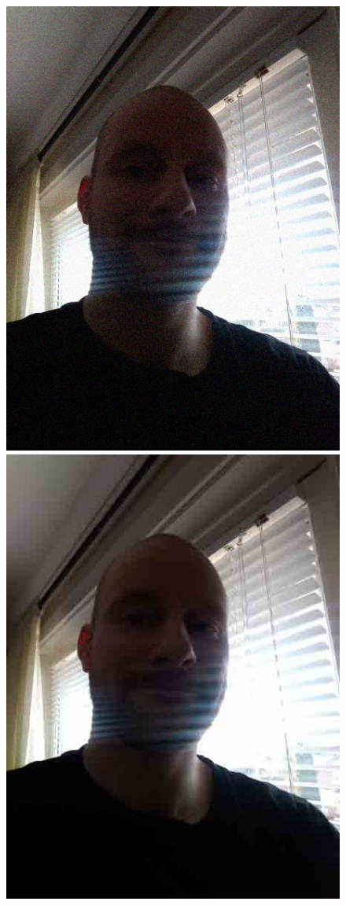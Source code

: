\begin{figure}[h]
    \subfloat
        {\includegraphics[scale = 0.13]{figures/0329noise.jpg}}
    \subfloat
        {\includegraphics[scale = 0.13]{figures/0329photoshop_compression.jpg}}

\end{figure}
